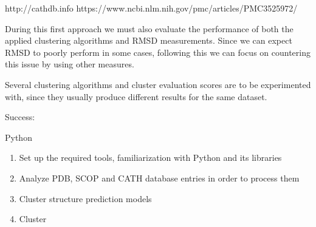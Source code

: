 http://cathdb.info
https://www.ncbi.nlm.nih.gov/pmc/articles/PMC3525972/



During this first approach we must also evaluate the performance of both the applied clustering algorithms and RMSD measurements. Since we can expect RMSD to poorly perform in some cases, following this we can focus on countering this issue by using other measures.

Several clustering algorithms and cluster evaluation scores are to be experimented with, since they usually produce different results for the same dataset.

Success: 


Python
\begin{enumerate}
	\item Set up the required tools, familiarization with Python and its libraries
	\item Analyze PDB, SCOP and CATH database entries in order to process them 
	\item Cluster structure prediction models
	\item Cluster 
\end{enumerate}